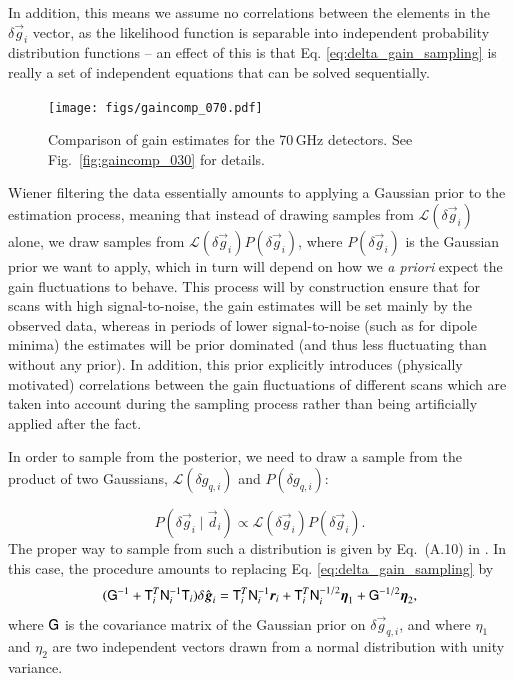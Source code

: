 \documentclass[twocolumn]{aa}
\renewcommand{\d}[0]{\vec{d}}
\newcommand{\T}[0]{\tens{T}}
\newcommand{\tG}[0]{\tens{G}}
\newcommand{\g}[0]{\vec{g}}
\newcommand{\N}[0]{\tens{N}}
\renewcommand{\r}[0]{\vec{r}}
\newcommand{\qi}[0]{_{q, i}}
\begin{document}
In addition, this means we assume no correlations between the elements in the $\delta \g_i$ vector, as the likelihood function is separable into independent probability distribution functions -- an effect of this is that Eq. \eqref{eq:delta_gain_sampling} is really a set of independent equations that can be solved sequentially. 
\begin{figure}[t]
  \center
  \texttt{[image: figs/gaincomp\_070.pdf]}
    \caption{Comparison of gain estimates for the 70\,GHz detectors. See Fig.~\ref{fig:gaincomp_030} for details.}
  \label{fig:gaincomp_070}
\end{figure}




Wiener filtering the data essentially amounts to applying a Gaussian prior to the estimation process, meaning that instead of drawing samples from $\mathcal{L}(\delta \g_i)$ alone, we draw samples from $\mathcal{L}(\delta \g_i) P(\delta \g_i)$, where $P(\delta \g_i)$ is the Gaussian prior we want to apply, which in turn will depend on how we \emph{a priori} expect the gain fluctuations to behave. This process will by construction ensure that for scans with high signal-to-noise, the gain estimates will be set mainly by the observed data, whereas in periods of lower signal-to-noise (such as for dipole minima) the estimates will be prior dominated (and thus less fluctuating than without any prior). In addition, this prior explicitly introduces (physically motivated) correlations between the gain fluctuations of different scans which are taken into account during the sampling process rather than being artificially applied after the fact.

In order to sample from the posterior, we need to draw a sample from the product of two Gaussians, $\mathcal{L}(\delta g\qi)$ and $P(\delta g\qi)$:

\begin{equation}
P(\delta \g_i \mid \d_i) \propto \mathcal{L}(\delta \g_i)P(\delta \g_i).
\end{equation}
The proper way to sample from such a distribution is given by Eq.~(A.10) in \citet{bp01}. In this case, the procedure amounts to replacing Eq. \eqref{eq:delta_gain_sampling} by 
\begin{equation}
    (\tG^{-1} + \T_i^T\N_i^{-1}\T_i)\delta \hat{\g}_i = \T_i^T\N_i^{-1}\r_i + \T_i^T\N_i^{-1/2}\vec\eta_1 + \tG^{-1/2}\vec\eta_2,
    \label{eq:delta_gain_sampling_with_prior}
\end{equation}
where $\tG$ is the covariance matrix of the Gaussian prior on $\delta\g\qi$, and where $\eta_1$ and $\eta_2$ are two independent vectors drawn from a normal distribution with unity variance. 
\end{document}
